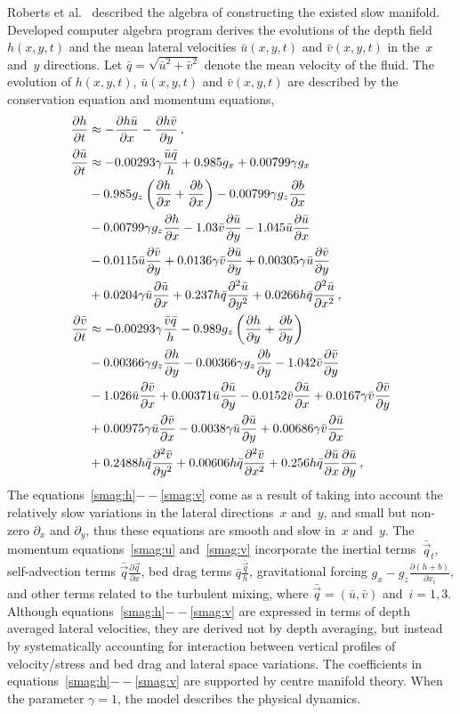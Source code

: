 \documentclass[twocolumn]{afmc_art}
\newcommand{\uu}{{\bar u}}
\newcommand{\vv}{{\bar v}}
\newcommand{\bq}{{\bar q}}
\newcommand{\qq}{{\bar{\vec q}}}
\begin{document}
Roberts et al.~\cite{Roberts:2008fk} described the algebra of constructing the existed slow manifold. 
Developed computer algebra program derives the evolutions of the depth field $h(x,y,t)$ and the mean lateral velocities $\uu(x,y,t)$ and $\vv(x,y,t)$ in the~$x$ and~$y$ directions. 
Let $\bq=\sqrt{\uu^2+\vv^2}$ denote the mean velocity of the fluid.
The evolution of $h(x,y,t)$, $\uu(x,y,t)$ and $\vv(x,y,t)$ are described by the conservation equation and momentum equations,
\begin{align}
\frac{\partial h}{\partial t}&
\approx-\frac{\partial h\bar u}{\partial x}-\frac{\partial h\bar v}{\partial y}\,,\label{smag:h}
\\
\frac{\partial\bar u}{\partial t}&
\approx-0.00293\gamma\frac{\bar u\bq}{h}+0.985g_x+0.00799\gamma g_x
\nonumber\\&
-0.985g_z\left(\frac{\partial h}{\partial x}+\frac{\partial b}{\partial x}\right)-0.00799\gamma g_z\D xb
\nonumber\\&
-0.00799\gamma g_z\D xh-1.03\bar v\frac{\partial\bar u}{\partial y}-1.045\bar u\frac{\partial\bar u}{\partial x}
\nonumber\\&
-0.0115\uu\D{y}{\vv}+0.0136\gamma\vv\D{y}{\uu}+0.00305\gamma\uu\D{y}{\vv}
\nonumber\\&
+0.0204\gamma\uu\D{x}{\uu}+0.237h\bq\DD y\uu+0.0266h\bq\DD x\uu\,,
\label{smag:u}
\\
\frac{\partial\bar v}{\partial t}&
\approx-0.00293\gamma\frac{\bar v\bq}{h}-0.989g_z\left(\frac{\partial h}{\partial y}+\frac{\partial b}{\partial y}\right)
\nonumber\\&
-0.00366\gamma g_z\D yh-0.00366\gamma g_z\D yb-1.042\bar v\frac{\partial\bar v}{\partial y}
\nonumber\\&
-1.026\bar u\frac{\partial\bar v}{\partial x}+0.00371\uu\D y\uu-0.0152\vv\D x\uu+0.0167\gamma\vv\D y\vv
\nonumber\\&
+0.00975\gamma\uu\D x\vv-0.0038\gamma\uu\D y\uu+0.00686\gamma\vv\D x\uu\nonumber\\&
+0.2488h\bq\DD y\vv+0.00606h\bq\DD x\vv+0.256h\bq\D x\uu\D y\uu
\,,\label{smag:v}
\end{align}
The equations~\eqref{smag:h}$--$\eqref{smag:v} come as a result of taking into account the relatively slow variations in the lateral directions~$x$ and~$y$, and small but non-zero $\partial_x$ and $\partial_y$, thus these equations are smooth and slow in~$x$ and~$y$.  
The momentum equations~\eqref{smag:u} and~\eqref{smag:v} incorporate the inertial terms~$\qq_t$, self-advection terms $\qq\frac{\partial\qq}{\partial x}$, bed drag terms $\bq\frac{\qq}{h}$, gravitational forcing $g_x-g_z\frac{\partial(h+b)}{\partial x_i}$, and other terms related to the turbulent mixing, where $\qq=(\uu,\vv)$ and~$i=1,3$. 
Although equations~\eqref{smag:h}$--$\eqref{smag:v} are expressed in terms of depth averaged lateral velocities, they are derived not by depth averaging, but instead by systematically accounting for interaction between vertical profiles of velocity/stress and bed drag and lateral space variations. 
The coefficients in equations~\eqref{smag:h}$--$\eqref{smag:v} are supported by centre manifold theory. 
When the parameter $\gamma=1$, the model describes the physical dynamics.
\end{document}
